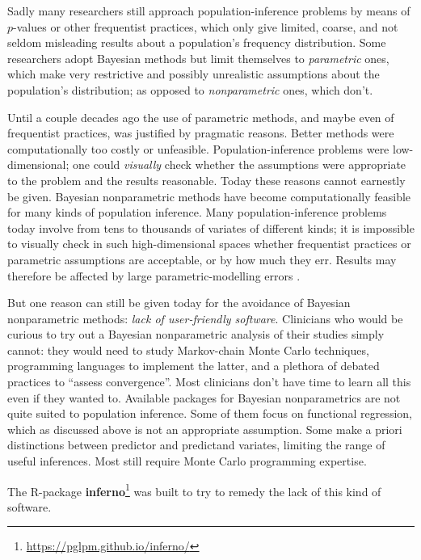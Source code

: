 
Sadly many researchers still approach population-inference problems by means of $p$-values or other frequentist practices, which only give limited, coarse, and not seldom misleading results about a population's frequency distribution. Some researchers adopt Bayesian methods but limit themselves to \emph{parametric} ones, which make very restrictive and possibly unrealistic assumptions about the population's distribution; as opposed to \emph{nonparametric} ones, which don't.

Until a couple decades ago the use of parametric methods, and maybe even of frequentist practices, was justified by pragmatic reasons. Better methods were computationally too costly or unfeasible. Population-inference problems were low-dimensional; one could \emph{visually} check whether the assumptions were appropriate to the problem and the results reasonable. Today these reasons cannot earnestly be given. Bayesian nonparametric methods have become computationally feasible for many kinds of population inference. Many population-inference problems today involve from tens to thousands of variates of different kinds; it is impossible to visually check in such high-dimensional spaces whether frequentist practices or parametric assumptions are acceptable, or by how much they err. Results may therefore be affected by large parametric-modelling errors \citep{draper1995}.

But one reason can still be given today for the avoidance of Bayesian nonparametric methods: \emph{lack of user-friendly software}. Clinicians who would be curious to try out a Bayesian nonparametric analysis of their studies simply cannot: they would need to study Markov-chain Monte Carlo techniques, programming languages to implement the latter, and a plethora of debated practices to ``assess convergence''. Most clinicians don't have time to learn all this even if they wanted to. Available packages for Bayesian nonparametrics are not quite suited to population inference. Some of them focus on functional regression, which as discussed above is not an appropriate assumption. Some make a priori distinctions between predictor and predictand variates, limiting the range of useful inferences. Most still require Monte Carlo programming expertise.

\medskip

The R-package \textbf{inferno}\footnote{\url{https://pglpm.github.io/inferno/}} was built to try to remedy the lack of this kind of software.

